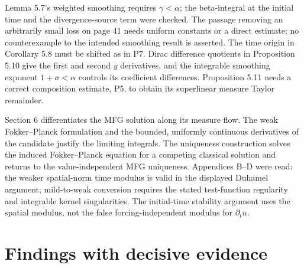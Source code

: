 \documentclass[10pt]{article}
\begin{document}
Lemma 5.7’s weighted smoothing requires \(\gamma<\alpha\); the beta-integral at the initial time and the divergence-source term were checked. The passage removing an arbitrarily small loss on page 41 needs uniform constants or a direct estimate; no counterexample to the intended smoothing result is asserted. The time origin in Corollary 5.8 must be shifted as in P7. Dirac difference quotients in Proposition 5.10 give the first and second \(y\) derivatives, and the integrable smoothing exponent \(1+\sigma<\alpha\) controls its coefficient differences. Proposition 5.11 needs a correct composition estimate, P5, to obtain its superlinear measure Taylor remainder.\par
Section 6 differentiates the MFG solution along its measure flow. The weak Fokker–Planck formulation and the bounded, uniformly continuous derivatives of the candidate justify the limiting integrals. The uniqueness construction solves the induced Fokker–Planck equation for a competing classical solution and returns to the value-independent MFG uniqueness. Appendices B–D were read: the weaker spatial-norm time modulus is valid in the displayed Duhamel argument; mild-to-weak conversion requires the stated test-function regularity and integrable kernel singularities. The initial-time stability argument uses the spatial modulus, not the false forcing-independent modulus for \(\partial_tu\).\par
\section*{Findings with decisive evidence}
\end{document}
